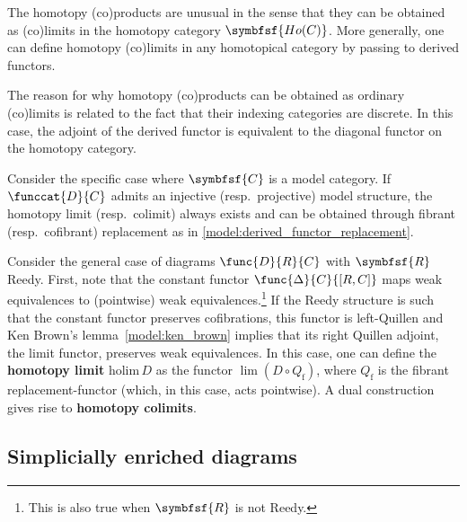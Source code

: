     The homotopy (co)products are unusual in the sense that they can be obtained as (co)limits in the homotopy category $\symbfsf{Ho(C)}$. More generally, one can define homotopy (co)limits in any homotopical category by passing to derived functors.
    \begin{remark}
        The reason for why homotopy (co)products can be obtained as ordinary (co)limits is related to the fact that their indexing categories are discrete. In this case, the adjoint of the derived functor is equivalent to the diagonal functor on the homotopy category.
    \end{remark}

    \begin{property}
        Consider the specific case where $\symbfsf{C}$ is a model category. If $\funccat{D}{C}$ admits an injective (resp.~projective) model structure, the homotopy limit (resp.~colimit) always exists and can be obtained through fibrant (resp.~cofibrant) replacement as in \cref{model:derived_functor_replacement}.
    \end{property}
    \begin{example}
        Consider the general case of diagrams $\func{D}{R}{C}$ with $\symbfsf{R}$ Reedy. First, note that the constant functor $\func{\Delta}{C}{[R,C]}$ maps weak equivalences to (pointwise) weak equivalences.\footnote{This is also true when $\symbfsf{R}$ is not Reedy.} If the Reedy structure is such that the constant functor preserves cofibrations, this functor is left-Quillen and Ken Brown's lemma~\ref{model:ken_brown} implies that its right Quillen adjoint, the limit functor, preserves weak equivalences. In this case, one can define the \textbf{homotopy limit} $\mathrm{holim}\,D$ as the functor $\lim(D\circ Q_\mathrm{f})$, where $Q_\mathrm{f}$ is the fibrant replacement-functor (which, in this case, acts pointwise). A dual construction gives rise to \textbf{homotopy colimits}.
    \end{example}

\subsection{Simplicially enriched diagrams}

